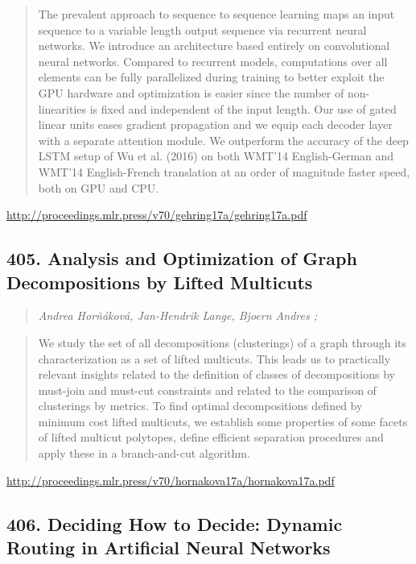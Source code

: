 \documentclass{article}
\begin{document}
\begin{quote}
    The prevalent approach to sequence to sequence learning maps an input sequence to a variable length output sequence via recurrent neural networks. We introduce an architecture based entirely on convolutional neural networks. Compared to recurrent models, computations over all elements can be fully parallelized during training to better exploit the GPU hardware and optimization is easier since the number of non-linearities is fixed and independent of the input length. Our use of gated linear units eases gradient propagation and we equip each decoder layer with a separate attention module. We outperform the accuracy of the deep LSTM setup of Wu et al. (2016) on both WMT’14 English-German and WMT’14 English-French translation at an order of magnitude faster speed, both on GPU and CPU.  \end{quote}

\href{http://proceedings.mlr.press/v70/gehring17a/gehring17a.pdf}{http://proceedings.mlr.press/v70/gehring17a/gehring17a.pdf}

\subsection{405. Analysis and Optimization of Graph Decompositions by Lifted Multicuts}

\begin{quote}
\footnotesize{\textit{Andrea Horňáková, Jan-Hendrik Lange, Bjoern Andres ;}}
\end{quote}

\begin{quote}
    We study the set of all decompositions (clusterings) of a graph through its characterization as a set of lifted multicuts. This leads us to practically relevant insights related to the definition of classes of decompositions by must-join and must-cut constraints and related to the comparison of clusterings by metrics. To find optimal decompositions defined by minimum cost lifted multicuts, we establish some properties of some facets of lifted multicut polytopes, define efficient separation procedures and apply these in a branch-and-cut algorithm.  \end{quote}

\href{http://proceedings.mlr.press/v70/hornakova17a/hornakova17a.pdf}{http://proceedings.mlr.press/v70/hornakova17a/hornakova17a.pdf}

\subsection{406. Deciding How to Decide: Dynamic Routing in Artificial Neural Networks}
\end{document}
